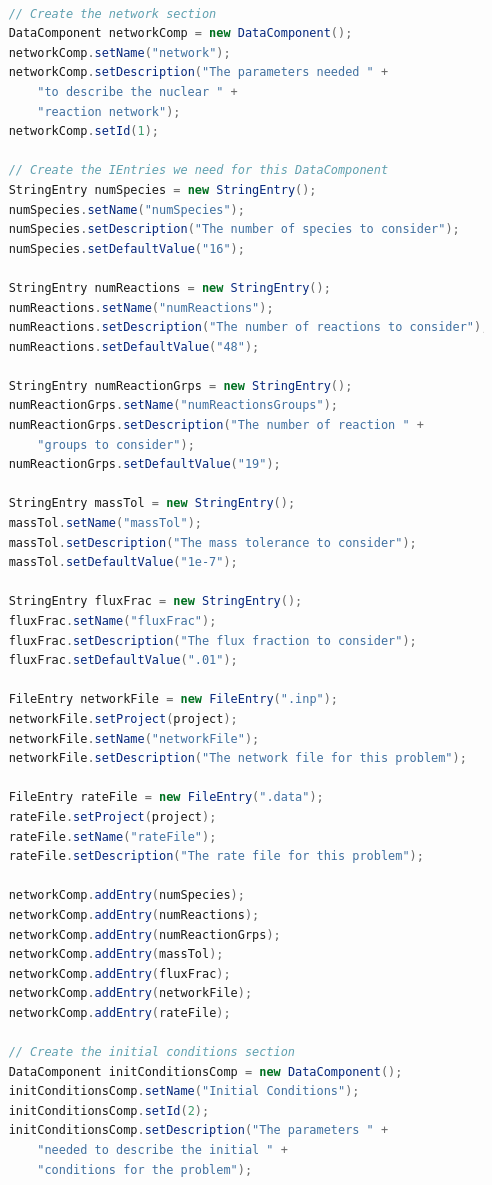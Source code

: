 \documentclass{article}
\begin{document}
\begin{lstlisting}[language=Java]

    // Create the network section
    DataComponent networkComp = new DataComponent();
    networkComp.setName("network");
    networkComp.setDescription("The parameters needed " +
        "to describe the nuclear " +
    	"reaction network"); 
    networkComp.setId(1);
    
    // Create the IEntries we need for this DataComponent
    StringEntry numSpecies = new StringEntry();
    numSpecies.setName("numSpecies");
    numSpecies.setDescription("The number of species to consider");
    numSpecies.setDefaultValue("16");
    
    StringEntry numReactions = new StringEntry();
    numReactions.setName("numReactions");
    numReactions.setDescription("The number of reactions to consider");
    numReactions.setDefaultValue("48");
    
    StringEntry numReactionGrps = new StringEntry();
    numReactionGrps.setName("numReactionsGroups");
    numReactionGrps.setDescription("The number of reaction " + 
    	"groups to consider"); 
    numReactionGrps.setDefaultValue("19");

    StringEntry massTol = new StringEntry();
    massTol.setName("massTol");
    massTol.setDescription("The mass tolerance to consider");
    massTol.setDefaultValue("1e-7");
    
    StringEntry fluxFrac = new StringEntry();
    fluxFrac.setName("fluxFrac");
    fluxFrac.setDescription("The flux fraction to consider");
    fluxFrac.setDefaultValue(".01");
    
    FileEntry networkFile = new FileEntry(".inp");
    networkFile.setProject(project);
    networkFile.setName("networkFile");
    networkFile.setDescription("The network file for this problem");
    
    FileEntry rateFile = new FileEntry(".data");
    rateFile.setProject(project);
    rateFile.setName("rateFile");
    rateFile.setDescription("The rate file for this problem");
    
    networkComp.addEntry(numSpecies);
    networkComp.addEntry(numReactions);
    networkComp.addEntry(numReactionGrps); 
    networkComp.addEntry(massTol);
    networkComp.addEntry(fluxFrac);
    networkComp.addEntry(networkFile);
    networkComp.addEntry(rateFile);
    
    // Create the initial conditions section
    DataComponent initConditionsComp = new DataComponent();
    initConditionsComp.setName("Initial Conditions");
    initConditionsComp.setId(2);
    initConditionsComp.setDescription("The parameters " +
    	"needed to describe the	initial " + 
    	"conditions for the problem");
    

\end{lstlisting}
\end{document}
